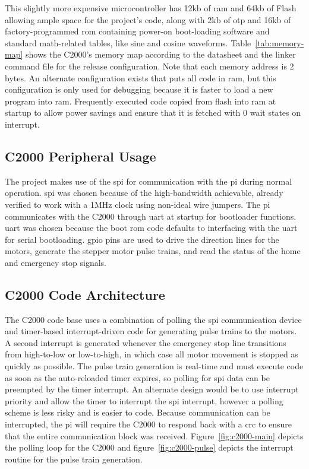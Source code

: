 This slightly more expensive microcontroller has 12\gls{kb} of \gls{ram} and 64\gls{kb} of Flash allowing ample space for the project's code, along with 2\gls{kb} of \gls{otp} and 16\gls{kb} of factory-programmed \gls{rom} containing power-on boot-loading software and standard math-related tables, like sine and cosine waveforms.
Table~\ref{tab:memory-map} shows the C2000's memory map according to the datasheet\cite{piccolo} and the linker command file for the release configuration.
Note that each memory address is 2 bytes. 
An alternate configuration exists that puts all code in \gls{ram}, but this configuration is only used for debugging because it is faster to load a new program into \gls{ram}.
Frequently executed code copied from flash into \gls{ram} at startup to allow power savings and ensure that it is fetched with 0 wait states on interrupt.

\subsection{C2000 Peripheral Usage}
The project makes use of the \gls{spi} for communication with the \gls{pi} during normal operation.
\gls{spi} was chosen because of the high-bandwidth achievable, already verified to work with a 1MHz clock using non-ideal wire jumpers.
The \gls{pi} communicates with the C2000 through \gls{uart} at startup for bootloader functions.
\gls{uart} was chosen because the boot \gls{rom} code defaults to interfacing with the \gls{uart} for serial bootloading.
\gls{gpio} pins are used to drive the direction lines for the motors, generate the stepper motor pulse trains, and read the status of the home and emergency stop signals.

\subsection{C2000 Code Architecture}
The C2000 code base uses a combination of polling the \gls{spi} communication device and timer-based interrupt-driven code for generating pulse trains to the motors.
A second interrupt is generated whenever the emergency stop line transitions from high-to-low or low-to-high, in which case all motor movement is stopped as quickly as possible.
The pulse train generation is real-time and must execute code as soon as the auto-reloaded timer expires, so polling for \gls{spi} data can be preempted by the timer interrupt.
An alternate design would be to use interrupt priority and allow the timer to interrupt the \gls{spi} interrupt, however a polling scheme is less risky and is easier to code.
Because communication can be interrupted, the \gls{pi} will require the C2000 to respond back with a \gls{crc} to ensure that the entire communication block was received.
Figure~\ref{fig:c2000-main} depicts the polling loop for the C2000 and figure~\ref{fig:c2000-pulse} depicts the interrupt routine for the pulse train generation.

